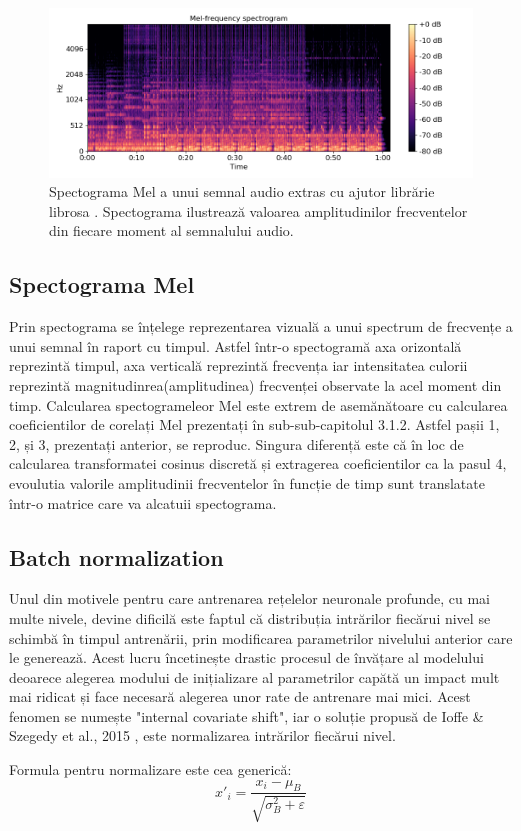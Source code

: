 \documentclass[a4paper,12pt]{book}
\begin{document}
			\begin{figure}[h]
				\centering
				\includegraphics[scale=0.67]{melspectogram}
				\caption{Spectograma Mel a unui semnal audio extras cu ajutor librărie librosa \cite{librosa}. Spectograma ilustrează valoarea amplitudinilor frecventelor din fiecare moment al semnalului audio.}
				\label{fig:melspec}
			\end{figure}
			
			\subsection{Spectograma Mel} \label{mel}
				Prin spectograma se înțelege reprezentarea vizuală a unui spectrum de frecvențe a unui semnal în raport cu timpul. Astfel într-o spectogramă axa orizontală reprezintă timpul, axa verticală reprezintă frecvența iar intensitatea culorii reprezintă magnitudinrea(amplitudinea) frecvenței observate la acel moment din timp. Calcularea spectogrameleor Mel este extrem de asemănătoare cu calcularea coeficientilor de corelați Mel prezentați în sub-sub-capitolul 3.1.2. Astfel pașii 1, 2, și 3, prezentați anterior, se reproduc. Singura diferență este că în loc de calcularea transformatei cosinus discretă și extragerea coeficientilor ca la pasul 4, evoulutia valorile amplitudinii frecventelor în funcție de timp sunt translatate într-o matrice care va alcatuii spectograma. \par
			\subsection{Batch normalization} \label{batch-norn}
				Unul din motivele pentru care antrenarea rețelelor neuronale profunde, cu mai multe nivele, devine dificilă este faptul că distribuția intrărilor fiecărui nivel se schimbă în timpul antrenării, prin modificarea parametrilor nivelului anterior care le generează. Acest lucru încetinește drastic procesul de învățare al modelului deoarece alegerea modului de inițializare al parametrilor capătă un impact mult mai ridicat și face necesară alegerea unor rate de antrenare mai mici. Acest fenomen se numește "internal covariate shift", iar o soluție propusă de Ioffe \& Szegedy et al., 2015 \cite{batch_norm}, este normalizarea intrărilor fiecărui nivel. \par Formula pentru normalizare este cea generică:
				\begin{equation*}
					x'_i = \frac{x_i - \mu_B}{\sqrt{\sigma^2_B +  \varepsilon}}
				\end{equation*}
				
\end{document}
